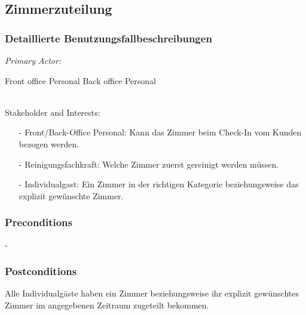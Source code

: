 \documentclass[./detailed_overview_usecases.tex]{subfiles}
\begin{document}
    \subsection{Zimmerzuteilung}
    \subsubsection{Detaillierte Benutzungsfallbeschreibungen}
    \textit{Primary Actor:}
    \begin{enumerate}
        Front office Personal
        Back office Personal
    \end{enumerate}
    \\
    Stakeholder and Interests:
    \begin{itemize}
        \item[-] Front/Back-Office Personal: Kann das Zimmer beim Check-In vom Kunden bezogen werden.
        \item[-] Reinigungsfachkraft: Welche Zimmer zuerst gereinigt werden müssen.
        \item[-] Individualgast: Ein Zimmer in der richtigen Kategorie beziehungsweise das explizit gewünschte Zimmer.
    \end{itemize}

    \subsubsection*{Preconditions}
    -
    \subsubsection*{Postconditions}
    Alle Individualgäste haben ein Zimmer beziehungsweise ihr explizit gewünschtes Zimmer im angegebenen Zeitraum zugeteilt bekommen.
\end{document}
